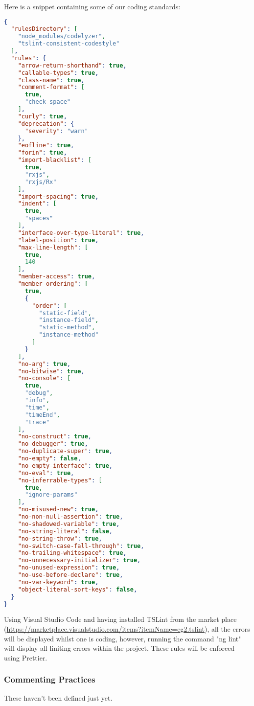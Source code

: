 \documentclass[11pt]{article}
\begin{document}
Here is a snippet containing some of our coding standards:
\begin{lstlisting}[language=json,firstnumber=1]
{
  "rulesDirectory": [
    "node_modules/codelyzer",
    "tslint-consistent-codestyle"
  ],
  "rules": {
    "arrow-return-shorthand": true,
    "callable-types": true,
    "class-name": true,
    "comment-format": [
      true,
      "check-space"
    ],
    "curly": true,
    "deprecation": {
      "severity": "warn"
    },
    "eofline": true,
    "forin": true,
    "import-blacklist": [
      true,
      "rxjs",
      "rxjs/Rx"
    ],
    "import-spacing": true,
    "indent": [
      true,
      "spaces"
    ],
    "interface-over-type-literal": true,
    "label-position": true,
    "max-line-length": [
      true,
      140
    ],
    "member-access": true,
    "member-ordering": [
      true,
      {
        "order": [
          "static-field",
          "instance-field",
          "static-method",
          "instance-method"
        ]
      }
    ],
    "no-arg": true,
    "no-bitwise": true,
    "no-console": [
      true,
      "debug",
      "info",
      "time",
      "timeEnd",
      "trace"
    ],
    "no-construct": true,
    "no-debugger": true,
    "no-duplicate-super": true,
    "no-empty": false,
    "no-empty-interface": true,
    "no-eval": true,
    "no-inferrable-types": [
      true,
      "ignore-params"
    ],
    "no-misused-new": true,
    "no-non-null-assertion": true,
    "no-shadowed-variable": true,
    "no-string-literal": false,
    "no-string-throw": true,
    "no-switch-case-fall-through": true,
    "no-trailing-whitespace": true,
    "no-unnecessary-initializer": true,
    "no-unused-expression": true,
    "no-use-before-declare": true,
    "no-var-keyword": true,
    "object-literal-sort-keys": false,
  }
}
\end{lstlisting}

Using Visual Studio Code and having installed TSLint from the market place (\url{https://marketplace.visualstudio.com/items?itemName=eg2.tslint}), all the errors will be displayed whilst one is coding, however, running the command "ng lint" will display all liniting errors within the project. These rules will be enforced using Prettier.

\subsubsection{Commenting Practices}

These haven't been defined just yet.
\end{document}
